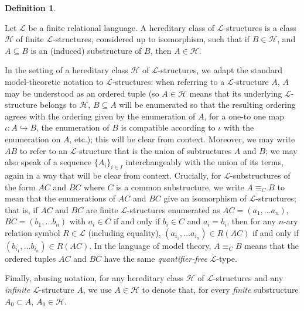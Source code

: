 \documentclass{amsart}
\theoremstyle{definition}
\newtheorem{definition}[theorem]{Definition}
\theoremstyle{remark}
\numberwithin{equation}{section}
\begin{document}
\begin{definition}\label{hereditary class}

Let $\mathcal{L}$ be a finite relational language. A hereditary class of $\mathcal{L}$-structures is a class $\mathcal{H}$ of finite $\mathcal{L}$-structures, considered up to isomorphism, such that if $B \in \mathcal{H}$, and $A \subseteq B$ is an (induced) substructure of $B$, then $A \in \mathcal{H}$.
    
\end{definition}


In the setting of a hereditary class $\mathcal{H}$ of $\mathcal{L}$-structures, we adapt the standard model-theoretic notation to $\mathcal{L}$-structures: when referring to a $\mathcal{L}$-structure $A$, $A$ may be understood as an ordered tuple (so $A \in \mathcal{H}$ means that its underlying $\mathcal{L}$-structure belongs to $\mathcal{H}$, $B \subseteq A$ will be enumerated so that the resulting ordering agrees with the ordering given by the enumeration of $A$, for a one-to one map $\iota: A \hookrightarrow B$, the enumeration of $B$ is compatible according to $\iota$ with the enumeration on $A$, etc.); this will be clear from context. Moreover, we may write $AB$ to refer to an $\mathcal{L}$-structure that is the union of subtructures $A$ and $B$; we may also speak of a sequence $\{A_{i}\}_{i \in I}$ interchangeably with the union of its terms, again in a way that will be clear from context. Crucially, for $\mathcal{L}$-substructures of the form $AC$ and $BC$ where $C$ is a common substructure, we write $A \equiv_{C} B$ to mean that the enumerations of $AC$ and $BC$ give an isomorphism of $\mathcal{L}$-structures; that is, if $AC$ and $BC$ are finite $\mathcal{L}$-structures enumerated as $AC = (a_{1}, \ldots a_{n} ) $, $BC = (b_{1}, \ldots b_{n}) $ with $a_{i} \in C$ if and only if $b_{i} \in C$ and $a_{i} = b_{i}$, then for any $n$-ary relation symbol $R \in \mathcal{L}$ (including equality), $(a_{i_{1}}, \ldots a_{i_{n}}) \in R(AC)$ if and only if $(b_{i_{1}}, \ldots b_{i_{n}}) \in R(AC)$. In the language of model theory, $A \equiv_{C} B$ means that the ordered tuples $AC$ and $BC$ have the same \textit{quantifier-free} $\mathcal{L}$-type.

Finally, abusing notation, for any hereditary class $\mathcal{H}$ of $\mathcal{L}$-structures and any \textit{infinite} $\mathcal{L}$-structure $A$, we use $A \in \mathcal{H}$ to denote that, for every \textit{finite} substructure $A_{0} \subset A$, $A_{0} \in \mathcal{H}$.
\end{document}

